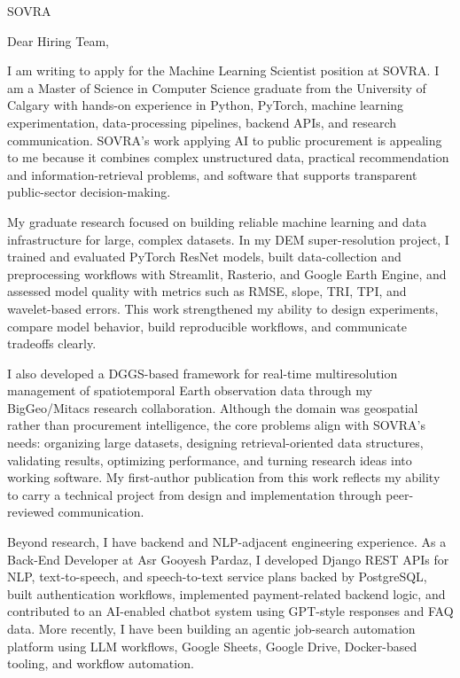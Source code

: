 \documentclass[11pt]{letter}
\begin{document}
\begin{letter}{SOVRA}

\opening{Dear Hiring Team,}

I am writing to apply for the Machine Learning Scientist position at SOVRA. I am a Master of Science in Computer Science graduate from the University of Calgary with hands-on experience in Python, PyTorch, machine learning experimentation, data-processing pipelines, backend APIs, and research communication. SOVRA's work applying AI to public procurement is appealing to me because it combines complex unstructured data, practical recommendation and information-retrieval problems, and software that supports transparent public-sector decision-making.

My graduate research focused on building reliable machine learning and data infrastructure for large, complex datasets. In my DEM super-resolution project, I trained and evaluated PyTorch ResNet models, built data-collection and preprocessing workflows with Streamlit, Rasterio, and Google Earth Engine, and assessed model quality with metrics such as RMSE, slope, TRI, TPI, and wavelet-based errors. This work strengthened my ability to design experiments, compare model behavior, build reproducible workflows, and communicate tradeoffs clearly.

I also developed a DGGS-based framework for real-time multiresolution management of spatiotemporal Earth observation data through my BigGeo/Mitacs research collaboration. Although the domain was geospatial rather than procurement intelligence, the core problems align with SOVRA's needs: organizing large datasets, designing retrieval-oriented data structures, validating results, optimizing performance, and turning research ideas into working software. My first-author publication from this work reflects my ability to carry a technical project from design and implementation through peer-reviewed communication.

Beyond research, I have backend and NLP-adjacent engineering experience. As a Back-End Developer at Asr Gooyesh Pardaz, I developed Django REST APIs for NLP, text-to-speech, and speech-to-text service plans backed by PostgreSQL, built authentication workflows, implemented payment-related backend logic, and contributed to an AI-enabled chatbot system using GPT-style responses and FAQ data. More recently, I have been building an agentic job-search automation platform using LLM workflows, Google Sheets, Google Drive, Docker-based tooling, and workflow automation.


\end{letter}
\end{document}
